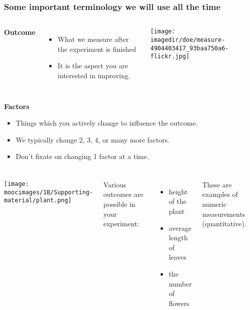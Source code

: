 \documentclass[handout,11pt,aspectratio=169,mathserif]{beamer}
\begin{document}
\begin{frame}\frametitle{Some important terminology we will use all the time}
	
	\begin{columns}[T]
			\textbf{{\color{purple} Outcome}}
				\begin{itemize}
					\item	What we measure after the experiment is finished  \pause
					\item	It is the aspect you are interested in improving.\pause
			 
				\end{itemize}
		
			\centerline{\texttt{[image: \\imagedir/doe/measure-4904403417\_93baa750a6-flickr.jpg]}}

	\end{columns}
	
			
	\vspace{24pt}
	\textbf{{\color{purple} Factors}}
		\begin{itemize}
			\item	Things which you actively change to influence the outcome.
			\item	We typically change 2, 3, 4, or many more factors. \pause
			\item	Don't fixate on changing 1 factor at a time.
		\end{itemize}
\end{frame}

\begin{frame}\frametitle{}
	
	\begin{columns}[c]
			\centerline{\texttt{[image: \\moocimages/1B/Supporting-material/plant.png]}}
		
			Various outcomes are possible in your experiment:
			
			\begin{itemize}
				\item	height of the plant
				\item	average length of leaves
				\item	the number of flowers
			\end{itemize}
			
			\vspace{12pt}
			These are examples of numeric measurements (quantitative).

	\end{columns}
\end{frame}
\end{document}
